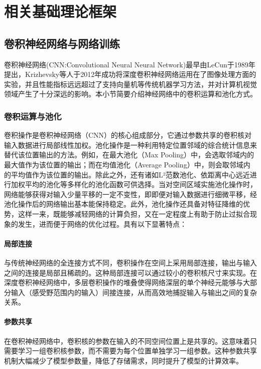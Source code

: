 \chapter{相关基础理论框架}

\section{卷积神经网络与网络训练}
卷积神经网络(CNN:Convolutional Neural Neural Network)最早由LeCun于1989年提出\cite{Zhou.etal2017}，Krizhevsky等人于2012年成功将深度卷积神经网络运用在了图像处理方面的实验，并且性能指标远远超过了支持向量机等传统机器学习方法，并对计算机视觉领域产生了十分深远的影响。本小节简要介绍神经网络中的卷积运算和池化方式。

\subsection{卷积运算与池化}
卷积操作是卷积神经网络（CNN）的核心组成部分，它通过参数共享的卷积核对输入数据进行局部线性加权。池化操作是一种利用特定位置邻域的综合统计信息来替代该位置输出的方法。例如，在最大池化（Max Pooling）中，会选取邻域内的最大值作为该位置的输出；而在均值池化（Average Pooling）中，则会取邻域内的平均值作为该位置的输出。除此之外，还有诸如L²范数池化、依距离中心远近进行加权平均的池化等多样化的池化函数可供选择。当对空间区域实施池化操作时，网络能够获得对输入少量平移的一定不变性，即即便对输入数据进行细微平移，经池化操作后的网络输出基本能保持稳定。此外，池化操作还具备对特征降维的优势，这样一来，既能够减轻网络的计算负担，又在一定程度上有助于防止过拟合现象的发生，进而便于网络的优化过程。具有以下显著特点：

\subsubsection{局部连接}
与传统神经网络的全连接方式不同，卷积操作在空间上采用局部连接，输出与输入之间的连接是局部且稀疏的。这种局部连接可以通过较小的卷积核尺寸来实现。在深度卷积神经网络中，多层卷积操作的堆叠使得网络深层的单个神经元能够与大部分输入（感受野范围内的输入）间接连接，从而高效地捕捉输入与输出之间的复杂关系。



\subsubsection{参数共享}
在卷积神经网络中，卷积核的参数在输入的不同空间位置上是共享的。这意味着只需要学习一组卷积核参数，而不需要为每个位置单独学习一组参数。这种参数共享机制大幅减少了模型参数量，降低了存储需求，同时提升了模型的计算效率。


